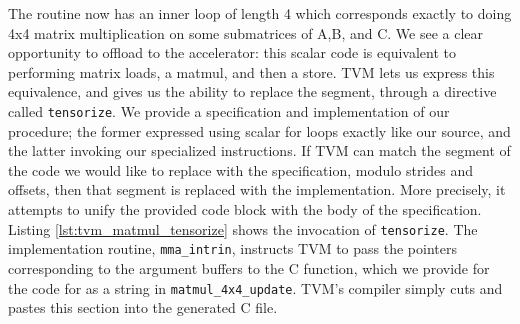 \documentclass[acmsmall, nonacm=true]{acmart}
\begin{document}
The routine now has an inner loop of length 4 which corresponds exactly to doing 4x4 matrix multiplication on some submatrices of A,B, and C. We see a clear opportunity to offload to the accelerator: this scalar code is equivalent to performing matrix loads, a matmul, and then a store. TVM lets us express this equivalence, and gives us the ability to replace the segment, through a directive called \verb|tensorize|. We provide a specification and implementation of our procedure; the former expressed using scalar for loops exactly like our source, and the latter invoking our specialized instructions. If TVM can match the segment of the code we would like to replace with the specification, modulo strides and offsets, then that segment is replaced with the implementation. More precisely, it attempts to unify the provided code block with the body of the specification. Listing \ref{lst:tvm_matmul_tensorize} shows the invocation of \verb|tensorize|. The implementation routine, \verb|mma_intrin|, instructs TVM to pass the pointers corresponding to the argument buffers to the C function, which we provide for the code for as a string in \verb|matmul_4x4_update|. TVM's compiler simply cuts and pastes this section into the generated C file.
\end{document}
